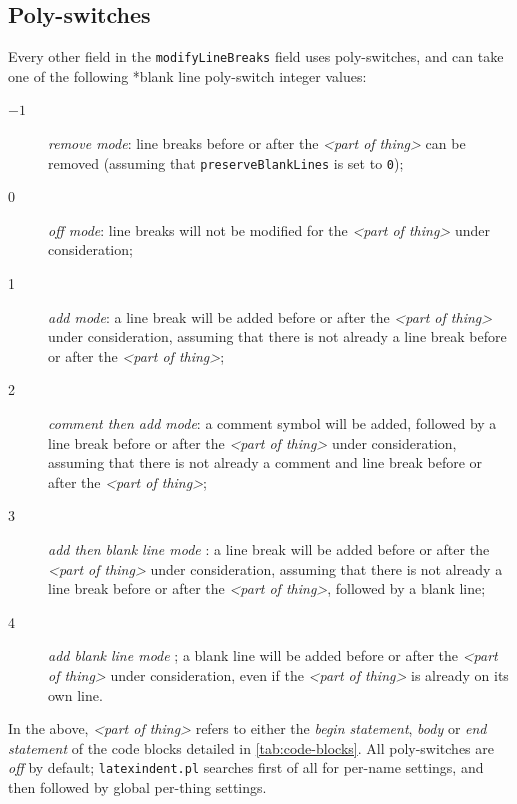 \documentclass[10pt]{article}
\begin{document}
\subsection{Poly-switches}\label{sec:poly-switches}
 Every other field in the \texttt{modifyLineBreaks} field uses poly-switches, and can take
 one of the following%
 *{blank line poly-switch} integer values:
 \begin{description}
  \item[$-1$] \emph{remove mode}: line breaks before or after the
        \emph{<part of thing>} can be removed (assuming that \texttt{preserveBlankLines} is
        set to \texttt{0});
  \item[0] \emph{off mode}: line breaks will not be modified for the
        \emph{<part of thing>} under consideration;
  \item[1] \emph{add mode}: a line break will be added before or after the
        \emph{<part of thing>} under consideration, assuming that
        there is not already a line break before or after the \emph{<part of thing>};
  \item[2] \emph{comment then add mode}: a comment symbol will be added, followed by a line break
        before or after the \emph{<part of thing>} under consideration, assuming that there is
        not already a comment and line break before or after the \emph{<part of thing>};
  \item[3] \emph{add then blank line mode}%
        : a line break will be added before or after
        the \emph{<part of thing>} under consideration, assuming that there is not already a line
        break before or after the \emph{<part of thing>}, followed by a blank line;
  \item[4] \emph{add blank line mode}%
        ; a blank line will
        be added before or after the \emph{<part of thing>} under consideration, even if the
        \emph{<part of thing>} is already on its own line.
 \end{description}
 In the above, \emph{<part of thing>} refers to either the \emph{begin statement},
 \emph{body} or \emph{end statement} of the code blocks detailed in
 \vref{tab:code-blocks}. All poly-switches are \emph{off} by default;
 \texttt{latexindent.pl} searches first of all for per-name settings, and then followed
 by global per-thing settings.
\end{document}
